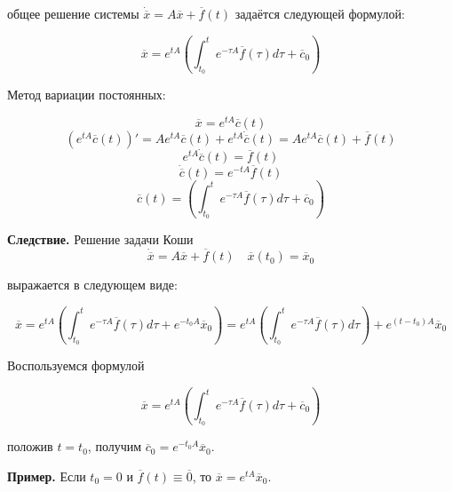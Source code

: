 \Th общее решение системы $\dot{\overline{x}} = A \overline{x} + \overline{f}(t)$ задаётся следующей формулой:

$$\overline{x} = e^{tA} \left( \int_{t_0}^t e^{-\tau A} \overline{f}(\tau) d\tau + \overline{c}_0 \right)$$

\Proof
Метод вариации постоянных:

$$\overline{x} = e^{tA}\overline{c}(t)$$
$$(e^{tA}\overline{c}(t))' = Ae^{tA}\overline{c}(t) + e^{tA} \dot{\overline{c}}(t) = Ae^{tA}\overline{c}(t) + \overline{f}(t)$$
$$e^{tA} \dot{\overline{c}}(t) = \overline{f}(t)$$
$$\dot{\overline{c}}(t) = e^{-tA} \overline{f}(t)$$
$$\overline{c}(t) = \left( \int_{t_0}^t e^{-\tau A} \overline{f}(\tau) d\tau + \overline{c}_0 \right)$$

\EndProof

\textbf{Следствие.} Решение задачи Коши
$$\dot{\overline{x}} = A\overline{x} + \overline{f}(t) \quad \overline{x}(t_0) = \overline{x}_0$$

выражается в следующем виде:

$$\overline{x} = e^{tA} \left( \int_{t_0}^t e^{-\tau A} \overline{f}(\tau) d\tau + e^{-t_0 A} \overline{x}_0 \right) = e^{tA} \left( \int_{t_0}^t e^{-\tau A} \overline{f}(\tau) d\tau \right) + e^{(t - t_0) A} \overline{x}_0$$

\Proof 

Воспользуемся формулой 

$$\overline{x} = e^{tA} \left( \int_{t_0}^t e^{-\tau A} \overline{f}(\tau) d\tau + \overline{c}_0 \right)$$

положив \(t = t_0\), получим \(\overline{c}_0 = e^{-t_0 A}\overline{x}_0\).

\EndProof

\textbf{Пример.} 
Если $t_0 = 0$ и $\overline{f}(t) \equiv \overline{0}$, то $\overline{x} = e^{tA}\overline{x}_0$.
